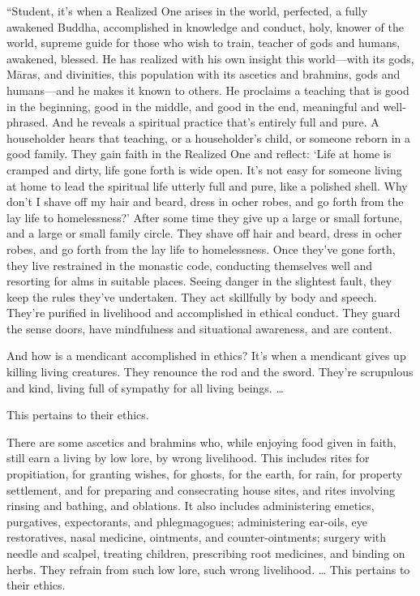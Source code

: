 \documentclass[12pt,openany]{book}%
\begin{document}
“Student, it’s when a Realized One arises in the world, perfected, a fully awakened Buddha, accomplished in knowledge and conduct, holy, knower of the world, supreme guide for those who wish to train, teacher of gods and humans, awakened, blessed. He has realized with his own insight this world—with its gods, \textsanskrit{Māras}, and divinities, this population with its ascetics and brahmins, gods and humans—and he makes it known to others. He proclaims a teaching that is good in the beginning, good in the middle, and good in the end, meaningful and well-phrased. And he reveals a spiritual practice that’s entirely full and pure. A householder hears that teaching, or a householder’s child, or someone reborn in a good family. They gain faith in the Realized One and reflect: ‘Life at home is cramped and dirty, life gone forth is wide open. It’s not easy for someone living at home to lead the spiritual life utterly full and pure, like a polished shell. Why don’t I shave off my hair and beard, dress in ocher robes, and go forth from the lay life to homelessness?’ After some time they give up a large or small fortune, and a large or small family circle. They shave off hair and beard, dress in ocher robes, and go forth from the lay life to homelessness. Once they’ve gone forth, they live restrained in the monastic code, conducting themselves well and resorting for alms in suitable places. Seeing danger in the slightest fault, they keep the rules they’ve undertaken. They act skillfully by body and speech. They’re purified in livelihood and accomplished in ethical conduct. They guard the sense doors, have mindfulness and situational awareness, and are content. 

And how is a mendicant accomplished in ethics? It’s when a mendicant gives up killing living creatures. They renounce the rod and the sword. They’re scrupulous and kind, living full of sympathy for all living beings. … 

This pertains to their ethics. 

There are some ascetics and brahmins who, while enjoying food given in faith, still earn a living by low lore, by wrong livelihood. This includes rites for propitiation, for granting wishes, for ghosts, for the earth, for rain, for property settlement, and for preparing and consecrating house sites, and rites involving rinsing and bathing, and oblations. It also includes administering emetics, purgatives, expectorants, and phlegmagogues; administering ear-oils, eye restoratives, nasal medicine, ointments, and counter-ointments; surgery with needle and scalpel, treating children, prescribing root medicines, and binding on herbs. They refrain from such low lore, such wrong livelihood. … This pertains to their ethics. 
\end{document}
